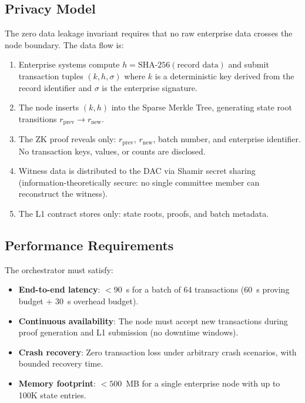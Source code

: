 \subsection{Privacy Model}

The zero data leakage invariant requires that no raw enterprise data
crosses the node boundary. The data flow is:

\begin{enumerate}
\item Enterprise systems compute $h = \text{SHA-256}(\text{record data})$ and
  submit transaction tuples $(k, h, \sigma)$ where $k$ is a deterministic
  key derived from the record identifier and $\sigma$ is the enterprise
  signature.

\item The node inserts $(k, h)$ into the Sparse Merkle Tree, generating
  state root transitions $r_{\text{prev}} \to r_{\text{new}}$.

\item The ZK proof reveals only: $r_{\text{prev}}$, $r_{\text{new}}$,
  batch number, and enterprise identifier. No transaction keys, values,
  or counts are disclosed.

\item Witness data is distributed to the DAC via Shamir secret sharing
  (information-theoretically secure: no single committee member can
  reconstruct the witness).

\item The L1 contract stores only: state roots, proofs, and batch metadata.
\end{enumerate}

\subsection{Performance Requirements}

The orchestrator must satisfy:
\begin{itemize}
\item \textbf{End-to-end latency}: $< 90$~s for a batch of 64 transactions
  (60~s proving budget + 30~s overhead budget).
\item \textbf{Continuous availability}: The node must accept new transactions
  during proof generation and L1 submission (no downtime windows).
\item \textbf{Crash recovery}: Zero transaction loss under arbitrary crash
  scenarios, with bounded recovery time.
\item \textbf{Memory footprint}: $< 500$~MB for a single enterprise node
  with up to 100K state entries.
\end{itemize}

